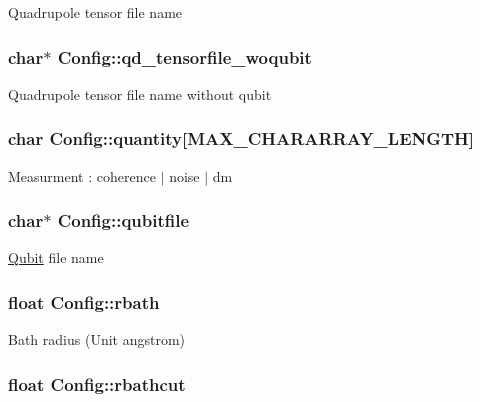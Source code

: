 Quadrupole tensor file name \hypertarget{structConfig_a93e5666a93192db9d1cd361381d64301}{
\subsubsection[{qd\-\_\-tensorfile\-\_\-woqubit}]{\setlength{\rightskip}{0pt plus 5cm}char$\ast$ Config\-::qd\-\_\-tensorfile\-\_\-woqubit}}\label{structConfig_a93e5666a93192db9d1cd361381d64301}
Quadrupole tensor file name without qubit \hypertarget{structConfig_a408cf9618ed41aefd0b0c323f57e0730}{
\subsubsection[{quantity}]{\setlength{\rightskip}{0pt plus 5cm}char Config\-::quantity\mbox{[}M\-A\-X\-\_\-\-C\-H\-A\-R\-A\-R\-R\-A\-Y\-\_\-\-L\-E\-N\-G\-T\-H\mbox{]}}}\label{structConfig_a408cf9618ed41aefd0b0c323f57e0730}
Measurment \-: coherence $|$ noise $|$ dm \hypertarget{structConfig_a9f5ed3dfb6ae52627a94099cb837cfbf}{
\subsubsection[{qubitfile}]{\setlength{\rightskip}{0pt plus 5cm}char$\ast$ Config\-::qubitfile}}\label{structConfig_a9f5ed3dfb6ae52627a94099cb837cfbf}
\hyperlink{structQubit}{Qubit} file name \hypertarget{structConfig_a79389333cffeb4063cf1d39e89234c57}{
\subsubsection[{rbath}]{\setlength{\rightskip}{0pt plus 5cm}float Config\-::rbath}}\label{structConfig_a79389333cffeb4063cf1d39e89234c57}
Bath radius (Unit angstrom) \hypertarget{structConfig_a2eeef76fa44792c24c3320ff6b4d19c8}{
\subsubsection[{rbathcut}]{\setlength{\rightskip}{0pt plus 5cm}float Config\-::rbathcut}}\label{structConfig_a2eeef76fa44792c24c3320ff6b4d19c8}
